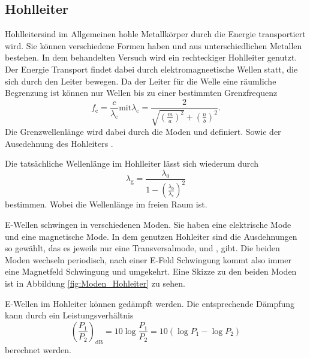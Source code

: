 \subsection{Hohlleiter}
Hohlleitersind im Allgemeinen hohle Metallkörper durch die Energie transportiert wird.
Sie können verschiedene Formen haben und aus unterschiedlichen Metallen bestehen.
In dem behandelten Versuch wird ein rechteckiger Hohlleiter genutzt.
Der Energie Transport findet dabei durch elektromagneetische Wellen statt, die sich durch den Leiter bewegen.
Da der Leiter für die Welle eine räumliche Begrenzung ist können nur Wellen bis zu einer bestimmten Grenzfrequenz
\begin{equation}
    f_\text{c} = \frac{c}{\lambda _\text{c}} \text{mit} \lambda _\text{c} = \frac{2}{\sqrt{ \left ( \frac{m}{a} \right )^2} + \left (\frac{n}{b} \right )^2}.
\end{equation}
Die Grenzwellenlänge wird dabei durch die Moden  und  definiert. Sowie der Ausedehnung des Hohleiters .


Die tatsächliche Wellenlänge im Hohlleiter  lässt sich wiederum durch 
\begin{equation}
    \lambda _\text{g} = \frac{\lambda _{0}}{1 - \left ( \frac{\lambda _0}{\lambda _\text{c}} \right )^2} 
\end{equation}
bestimmen.
Wobei  die Wellenlänge im freien Raum ist.

E-Wellen schwingen in verschiedenen Moden.
Sie haben eine elektrische Mode und eine magnetische Mode.
In dem genutzen Hohleiter sind die Ausdehnungen so gewählt, das es jeweils nur eine Transversalmode,  und , gibt.
Die beiden Moden wechseln periodisch, nach einer E-Feld Schwingung kommt also immer eine Magnetfeld Schwingung und umgekehrt.
Eine Skizze zu den beiden Moden ist in Abbildung \ref{fig:Moden_Hohleiter} zu sehen.


E-Wellen im Hohleiter können gedämpft werden. Die entsprechende Dämpfung kann durch ein Leistungsverhältnis
\begin{equation}
    \left (\frac{P_1}{P_2} \right )_\text{dB} = 10 \log \frac{P_1}{P_2} = 10 \left ( \log P_1 - \log P_2 \right )
\end{equation}
berechnet werden.


